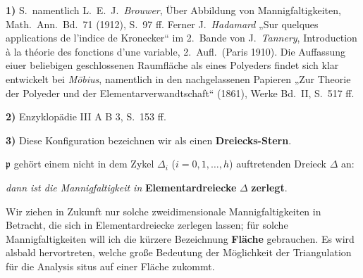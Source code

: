 \documentclass{article}
\begin{document}
\textbf{1)} S.\ namentlich L.\ E.\ J.\ \emph{Brouwer}, Über Abbildung von Mannigfaltigkeiten, Math.\ Ann.\ Bd.\ 71 (1912), S.\ 97 ff. Ferner J.\ \emph{Hadamard} „Sur quelques applications de l'indice de Kronecker“ im 2.\ Bande von J.\ \emph{Tannery}, Introduction à la théorie des fonctions d'une variable, 2.\ Aufl.\ (Paris 1910). Die Auffassung eiuer beliebigen geschlossenen Raumfläche als eines Polyeders findet sich klar entwickelt bei \emph{Möbius}, namentlich in den nachgelassenen Papieren „Zur Theorie der Polyeder und der Elementarverwandtschaft“ (1861), Werke Bd.\ II, S.\ 517 ff.

\textbf{2)} Enzyklopädie III A B 3, S.\ 153 ff.

\textbf{3)} Diese Konfiguration bezeichnen wir als einen \textbf{Dreiecks-Stern}.

$\mathfrak{p}$ gehört einem nicht in dem Zykel $\Delta_i$ ($i = 0, 1, \dots, h$) auftretenden Dreieck $\Delta$ an:

\emph{dann ist die Mannigfaltigkeit in} \textbf{Elementardreiecke} $\Delta$ \textbf{zerlegt}.

Wir ziehen in Zukunft nur solche zweidimensionale Mannigfaltigkeiten in Betracht, die sich in Elementardreiecke zerlegen lassen; für solche Mannigfaltigkeiten will ich die kürzere Bezeichnung \textbf{Fläche} gebrauchen. Es wird alsbald hervortreten, welche große Bedeutung der Möglichkeit der Triangulation für die Analysis situs auf einer Fläche zukommt.
\end{document}
